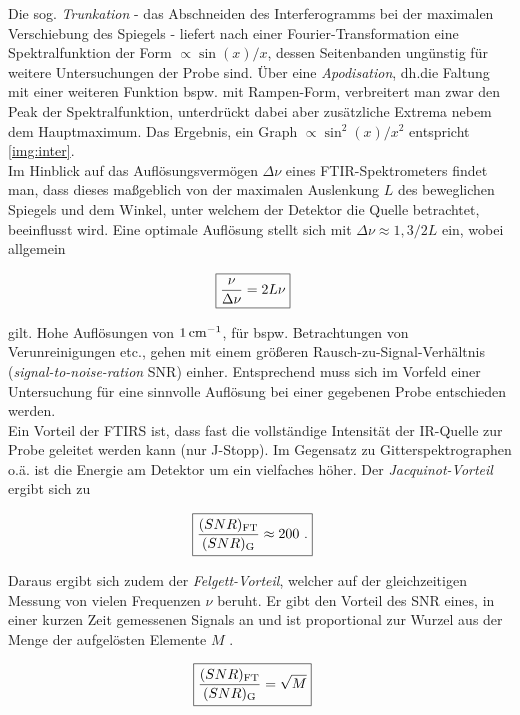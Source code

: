\documentclass[a4paper,10pt,twocolumn]{article}
\newcommand{\ix}[1]{_\text{#1}}
\newcommand{\tilt}[1]{\textit{#1}}
\begin{document}
		Die sog. \tilt{Trunkation} - das Abschneiden des Interferogramms bei der maximalen Verschiebung des Spiegels - liefert nach einer Fourier-Transformation eine Spektralfunktion der Form $\propto\sin(x)/x$, dessen Seitenbanden ung\"unstig f\"ur weitere Untersuchungen der Probe sind. \"Uber eine \tilt{Apodisation}, dh.die Faltung mit einer weiteren Funktion bspw. mit Rampen-Form, verbreitert man zwar den Peak der Spektralfunktion, unterdr\"uckt dabei aber zus\"atzliche Extrema nebem dem Hauptmaximum. Das Ergebnis, ein Graph $\propto\sin^{2}(x)/x^{2}$ entspricht \autoref{img:inter}.\\
		Im Hinblick auf das Aufl\"osungsverm\"ogen $\Delta\nu$ eines FTIR-Spektrometers findet man, dass dieses ma{\ss}geblich von der maximalen Auslenkung $L$ des beweglichen Spiegels und dem Winkel, unter welchem der Detektor die Quelle betrachtet, beeinflusst wird. Eine optimale Aufl\"osung stellt sich mit $\Delta\nu\approx1,3/2L$ ein, wobei allgemein
		
		\begin{align}
			\Aboxed{
			\frac{\nu}{\Delta\nu}=2L\nu
			} \nonumber
		\end{align} 
		
		gilt. Hohe Aufl\"osungen von $\unit[1]{cm^{-1}}$, f\"ur bspw. Betrachtungen von Verunreinigungen etc., gehen mit einem gr\"o{\ss}eren Rausch-zu-Signal-Verh\"altnis (\tilt{signal-to-noise-ration} SNR) einher. Entsprechend muss sich im Vorfeld einer Untersuchung f\"ur eine sinnvolle Aufl\"osung bei einer gegebenen Probe entschieden werden.\\
		Ein Vorteil der FTIRS ist, dass fast die vollst\"andige Intensit\"at der IR-Quelle zur Probe geleitet werden kann (nur J-Stopp). Im Gegensatz zu Gitterspektrographen o.\"a. ist die Energie am Detektor um ein vielfaches h\"oher. Der \tilt{Jacquinot-Vorteil} ergibt sich zu
		
		\begin{align}
			\Aboxed{
			\frac{(SNR)\ix{FT}}{(SNR)\ix{G}}\approx200\,\,.
			} \nonumber
		\end{align} 
		
		Daraus ergibt sich zudem der \tilt{Felgett-Vorteil}, welcher auf der gleichzeitigen Messung von vielen Frequenzen $\nu$ beruht. Er gibt den Vorteil des SNR eines, in einer kurzen Zeit gemessenen Signals an und ist proportional zur Wurzel aus der Menge der aufgel\"osten Elemente $M$ \cite{FTIRAns}.
		
		\begin{align}
			\Aboxed{
			\frac{(SNR)\ix{FT}}{(SNR)\ix{G}}=\sqrt{M}
			} \nonumber
		\end{align}
		
\end{document}
